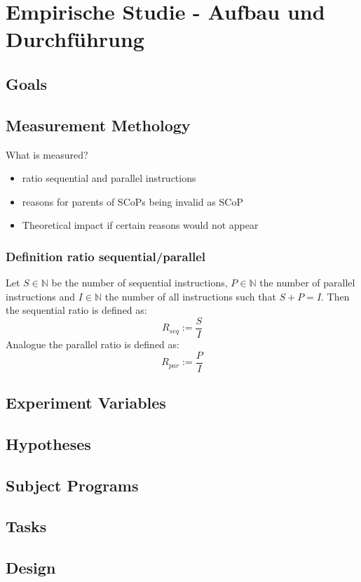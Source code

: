 \chapter{Empirische Studie - Aufbau und Durchführung}
\section{Goals}

\section{Measurement Methology}
What is measured?
\begin{itemize}
    \item ratio sequential and parallel instructions
    \item reasons for parents of SCoPs being invalid as SCoP
    \item Theoretical impact if certain reasons would not appear
\end{itemize}
\subsection{Definition ratio sequential/parallel}
Let \(S\in\mathbb{N}\) be the number of sequential instructions, \(P\in\mathbb{N}\) the number of parallel instructions and \(I\in\mathbb{N}\) the number of all instructions such that \(S + P = I\).
Then the sequential ratio is defined as:
\[R_{seq} := \frac{S}{I}\]
Analogue the parallel ratio is defined as:
\[R_{par} := \frac{P}{I}\]

\section{Experiment Variables}

\section{Hypotheses}

\section{Subject Programs}

\section{Tasks}

\section{Design}

